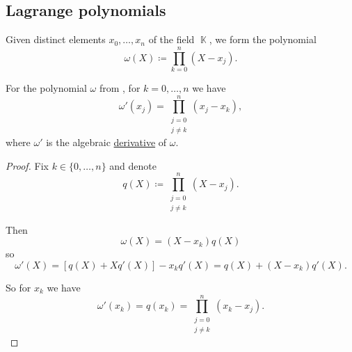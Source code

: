 \subsection{Lagrange polynomials}\label{subsec:lagrange_polynomials}

\begin{definition}\label{def:omega_polynomial}
  Given distinct elements \( x_0, \ldots, x_n \) of the field \( \BbbK \), we form the polynomial
  \begin{equation*}
    \omega(X) \coloneqq \prod_{k=0}^n (X - x_j).
  \end{equation*}
\end{definition}

\begin{proposition}\label{thm:omega_polynomial_derivative}
  For the polynomial \( \omega \) from , for \( k = 0, \ldots, n \) we have
  \begin{equation*}
    \omega'(x_j) = \prod_{\substack{j = 0 \\ j \neq k}}^n (x_j - x_k),
  \end{equation*}
  where \( \omega' \) is the algebraic \hyperref[def:algebraic_derivative]{derivative} of \( \omega \).
\end{proposition}
\begin{proof}
  Fix \( k \in \{ 0, \ldots, n \} \) and denote
  \begin{equation*}
    q(X) \coloneqq \prod_{\substack{j = 0 \\ j \neq k}}^n (X - x_j).
  \end{equation*}

  Then
  \begin{equation*}
    \omega(X) = (X - x_k) q(X)
  \end{equation*}
  so
  \begin{equation*}
    \omega'(X) = [q(X) + X q'(X)] - x_k q'(X) = q(X) + (X - x_k) q'(X).
  \end{equation*}

  So for \( x_k \) we have
  \begin{equation*}
    \omega'(x_k) = q(x_k) = \prod_{\substack{j = 0 \\ j \neq k}}^n (x_k - x_j).
  \end{equation*}
\end{proof}

